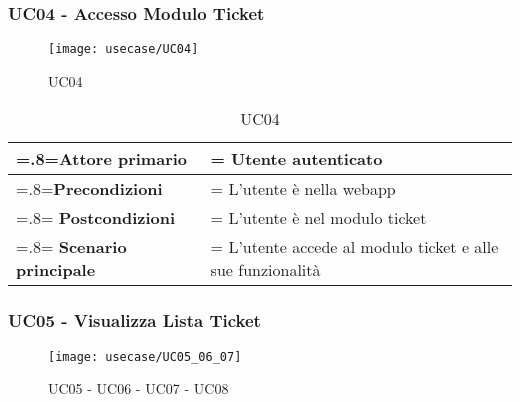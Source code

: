 \subsubsection{UC04 - Accesso Modulo Ticket}
\begin{figure}[H]
    \centering 
    \texttt{[image: usecase/UC04]}
    \caption{UC04}
\end{figure}

\begin{table}[H]
                \centering
                \renewcommand{\arraystretch}{1.8}
                \renewcommand\tabularxcolumn[1]{m{#1}}
                \begin{tabularx}{0.9\textwidth} {
                    >{\hsize=.8\hsize\linewidth=\hsize}X
                    >{\hsize=1.2\hsize\linewidth=\hsize}X}
                    \hline
                    \textbf{Attore primario} & Utente autenticato \\
                    \hline
      
                    \hline
                    \textbf{Precondizioni} & L'utente è nella webapp \\
                    \hline
                    \textbf{Postcondizioni} & L'utente è nel modulo ticket \\
                    \hline
                    \textbf{Scenario principale} & L'utente accede al modulo ticket e alle sue funzionalità \\
                    \hline
                \end{tabularx}
                \caption{UC04}
            \end{table}
            
  
\subsubsection{UC05 - Visualizza Lista Ticket}  
        
        \begin{figure}[H]
    \centering 
    \texttt{[image: usecase/UC05\_06\_07]}
    \caption{UC05 - UC06 - UC07 - UC08}
\end{figure}


